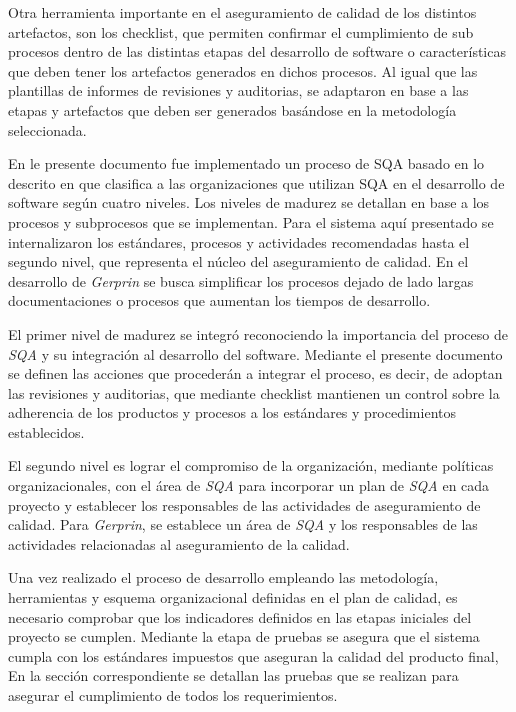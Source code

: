 Otra herramienta importante en el aseguramiento de calidad de los distintos artefactos, son los checklist, que permiten confirmar el cumplimiento de sub procesos dentro de las distintas etapas del desarrollo de software o características que deben tener los artefactos generados en dichos procesos. Al igual que las plantillas de informes de revisiones y auditorias, se adaptaron en base a las etapas y artefactos que deben ser generados basándose en la metodología seleccionada.

En le presente documento fue implementado un proceso de SQA basado en lo descrito en \citet{web00} que clasifica a las organizaciones que utilizan SQA en el desarrollo de software según cuatro niveles. Los niveles de madurez se detallan en base a los procesos y subprocesos que se implementan. Para el sistema aquí presentado se internalizaron los estándares, procesos y actividades recomendadas hasta el segundo nivel, que representa el núcleo del aseguramiento de calidad. En el desarrollo de \textit{Gerprin} se busca simplificar los procesos dejado de lado largas documentaciones o procesos que aumentan los tiempos de desarrollo.

El primer nivel de madurez se integró reconociendo la importancia del proceso de \textit{SQA} y su integración al desarrollo del software. Mediante el presente documento se definen las acciones que procederán a integrar el proceso, es decir, de adoptan las revisiones y auditorias, que mediante checklist mantienen un control sobre la adherencia de los productos y procesos a los estándares y procedimientos establecidos.

El segundo nivel es lograr el compromiso de la organización, mediante políticas organizacionales, con el área de \textit{SQA} para incorporar un plan de \textit{SQA} en cada proyecto y establecer los responsables de las actividades de aseguramiento de calidad. Para \textit{Gerprin}, se establece un área de \textit{SQA} y los responsables de las actividades relacionadas al aseguramiento de la calidad. 

Una vez realizado el proceso de desarrollo empleando las metodología, herramientas y esquema organizacional definidas en el plan de calidad, es necesario comprobar que los indicadores definidos en las etapas iniciales del proyecto se cumplen. Mediante la etapa de pruebas se asegura que el sistema cumpla con los estándares impuestos que aseguran la calidad del producto final, En la sección correspondiente se detallan las pruebas que se realizan para asegurar el cumplimiento de todos los requerimientos. 

